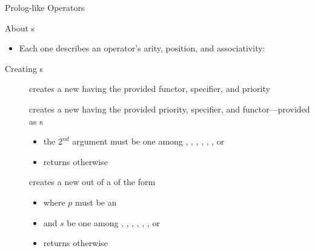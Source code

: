 \documentclass[handout]{beamer}
\begin{document}
\begin{frame}[allowframebreaks]{Prolog-like Operators}
\begin{block}{About s}
\begin{itemize}
            \item Each one describes an operator's arity, position, and associativity:
            \medskip
            
        \end{itemize}
    \end{block}

    \begin{block}{Creating s}
        \begin{description}
            \item[] creates a new  having the provided functor, specifier, and priority
            \item[] creates a new  having the provided priority, specifier, and functor---provided as s
            \begin{itemize}\small
                \item the $2^{nd}$ argument must be one  among , , , , , , or 
                \item returns  otherwise
            \end{itemize}
            \item[] creates a new  out of a  of the form 
            \begin{itemize}\small
                \item where $p$ must be an 
                \item and $s$ be one  among , , , , , , or 
                \item returns  otherwise
            \end{itemize}
        \end{description}
    \end{block}
\end{frame}
\end{document}
